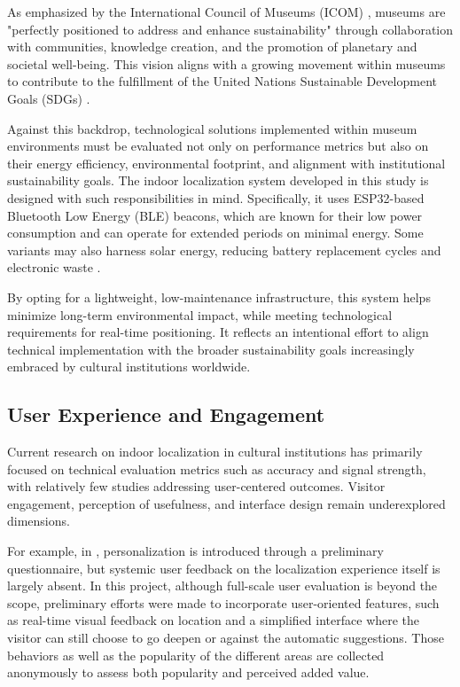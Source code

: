 As emphasized by the International Council of Museums (ICOM) \cite{icom_sustainability}, museums are "perfectly positioned to address and enhance sustainability" through collaboration with communities, knowledge creation, and the promotion of planetary and societal well-being. This vision aligns with a growing movement within museums to contribute to the fulfillment of the United Nations Sustainable Development Goals (SDGs) \cite{onofri_life_2024, rodriguez_contribution_2024}.

Against this backdrop, technological solutions implemented within museum environments must be evaluated not only on performance metrics but also on their energy efficiency, environmental footprint, and alignment with institutional sustainability goals. The indoor localization system developed in this study is designed with such responsibilities in mind. Specifically, it uses ESP32-based Bluetooth Low Energy (BLE) beacons, which are known for their low power consumption and can operate for extended periods on minimal energy. Some variants may also harness solar energy, reducing battery replacement cycles and electronic waste \cite{spachos_ble_2020}.

By opting for a lightweight, low-maintenance infrastructure, this system helps minimize long-term environmental impact, while meeting technological requirements for real-time positioning. It reflects an intentional effort to align technical implementation with the broader sustainability goals increasingly embraced by cultural institutions worldwide.

\subsection{User Experience and Engagement}

Current research on indoor localization in cultural institutions has primarily focused on technical evaluation metrics such as accuracy and signal strength, with relatively few studies addressing user-centered outcomes. Visitor engagement, perception of usefulness, and interface design remain underexplored dimensions.  

For example, in \cite{alletto_indoor_2016}, personalization is introduced through a preliminary questionnaire, but systemic user feedback on the localization experience itself is largely absent. In this project, although full-scale user evaluation is beyond the scope, preliminary efforts were made to incorporate user-oriented features, such as real-time visual feedback on location and a simplified interface where the visitor can still choose to go deepen or against the automatic suggestions. Those behaviors as well as the popularity of the different areas are collected anonymously to assess both popularity and perceived added value. 

